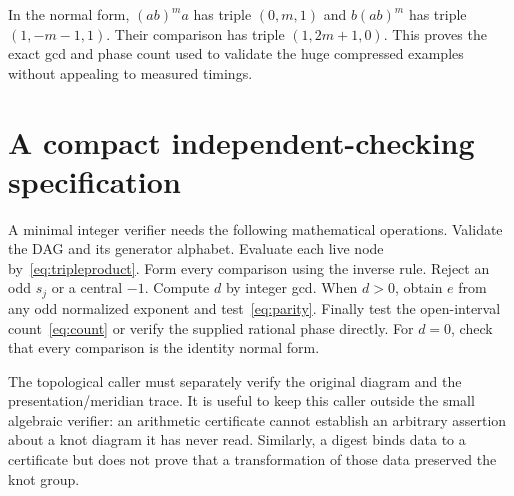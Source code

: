 \documentclass[11pt]{article}
\theoremstyle{definition}
\theoremstyle{remark}
\begin{document}
In the normal form, $(ab)^m a$ has triple $(0,m,1)$ and $b(ab)^m$ has triple $(1,-m-1,1)$. Their comparison has triple $(1,2m+1,0)$. This proves the exact gcd and phase count used to validate the huge compressed examples without appealing to measured timings.

\section{A compact independent-checking specification}
A minimal integer verifier needs the following mathematical operations. Validate the DAG and its generator alphabet. Evaluate each live node by~\eqref{eq:tripleproduct}. Form every comparison using the inverse rule. Reject an odd $s_j$ or a central $-1$. Compute $d$ by integer gcd. When $d>0$, obtain $e$ from any odd normalized exponent and test~\eqref{eq:parity}. Finally test the open-interval count~\eqref{eq:count} or verify the supplied rational phase directly. For $d=0$, check that every comparison is the identity normal form.

The topological caller must separately verify the original diagram and the presentation/meridian trace. It is useful to keep this caller outside the small algebraic verifier: an arithmetic certificate cannot establish an arbitrary assertion about a knot diagram it has never read. Similarly, a digest binds data to a certificate but does not prove that a transformation of those data preserved the knot group.
\end{document}

